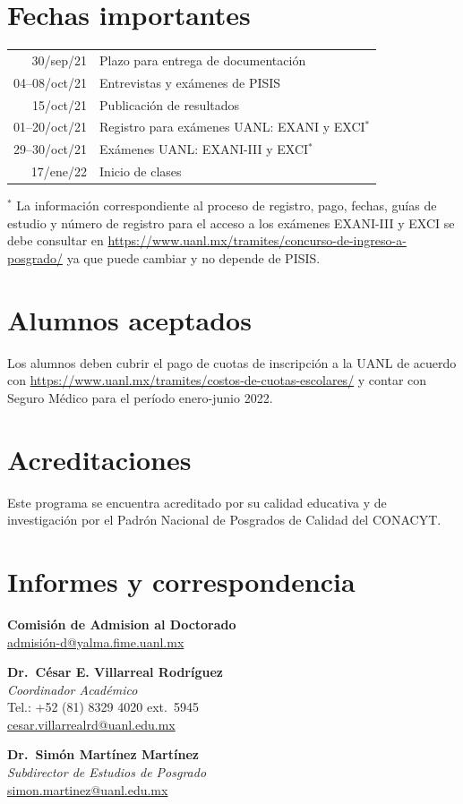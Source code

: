 \documentclass[a0]{sciposter}
\begin{document}
\begin{multicols}{2}
\section*{Fechas importantes}

\begin{tabular}{rl}
30/sep/21 &  Plazo para entrega de documentación \\
04--08/oct/21 & Entrevistas y exámenes de PISIS \\
15/oct/21 & Publicación de resultados \\
01--20/oct/21 & Registro para exámenes UANL: EXANI y EXCI$^*$ \\
29--30/oct/21 & Exámenes UANL: EXANI-III y EXCI$^*$ \\
17/ene/22 & Inicio de clases
\end{tabular}

$^*$ La información correspondiente al proceso de registro, pago,
fechas, guías de estudio y número de registro para el acceso a los
exámenes EXANI-III y EXCI se debe consultar en
\url{https://www.uanl.mx/tramites/concurso-de-ingreso-a-posgrado/} ya
que puede cambiar y no depende de PISIS.

\section*{Alumnos aceptados}

Los alumnos deben cubrir el pago de cuotas de inscripción a la UANL de
acuerdo con
\url{https://www.uanl.mx/tramites/costos-de-cuotas-escolares/} y
contar con Seguro Médico para el período enero-junio 2022.

\section*{Acreditaciones}

Este programa se encuentra acreditado por su calidad educativa y de
investigación por el Padrón Nacional de Posgrados de Calidad del
CONACYT.

\section*{Informes y correspondencia}

{\bf Comisión de Admision al Doctorado}\\
\href{mailto:admisión-d@yalma.fime.uanl.mx}{admisión-d@yalma.fime.uanl.mx}

\quad

{\bf Dr.\ César E. Villarreal Rodríguez} \\
{\em Coordinador Académico} \\
Tel.: +52 (81) 8329 4020 ext.\ 5945 \\
\href{mailto:cesar.villarrealrd@uanl.edu.mx}{cesar.villarrealrd@uanl.edu.mx }

\quad

{\bf Dr.\ Simón Martínez Martínez} \\
{\em Subdirector de Estudios de Posgrado} \\
\href{mailto:simon.martinez@uanl.edu.mx}{simon.martinez@uanl.edu.mx}

\end{multicols}
\end{document}
